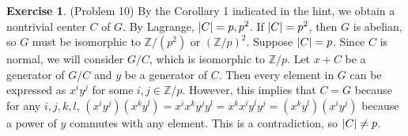 \documentclass[12pt, psamsfonts]{amsart}
\theoremstyle{definition}
\newtheorem*{exer}{Exercise}
\theoremstyle{remark}
\numberwithin{equation}{section}
\begin{document}
\begin{exer}{(Problem 10)}
  By the Corollary 1 indicated in the hint, we obtain a nontrivial center $C$ of $G$.
  By Lagrange, $\abs{C} = p, p^2$.
  If $\abs{C} = p^2$, then $G$ is abelian, so $G$ must be isomorphic to $\mathbb{Z} / (p^2)$ or $(\mathbb{Z} / p)^2$.
  Suppose $\abs{C} = p$.
  Since $C$ is normal, we will consider $G / C$, which is isomorphic to $\mathbb{Z} / p$.
  Let $x + C$ be a generator of $G / C$ and $y$ be a generator of $C$.
  Then every element in $G$ can be expressed as $x^iy^j$ for some $i, j \in \mathbb{Z}/p$.
  However, this implies that $C = G$ because for any $i, j, k, l$, $(x^iy^j)(x^ky^l) = x^ix^ky^jy^l = x^kx^iy^ly^j = (x^ky^l)(x^iy^j)$ because a power of $y$ commutes with any element.
  This is a contradiction, so $\abs{C} \ne p$.
\end{exer}
\end{document}
